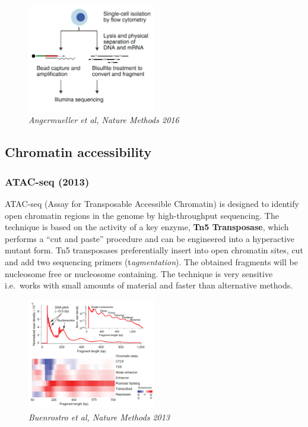 \begin{figure}
\centering
\includegraphics[width=0.5\textwidth]{images/Screenshot_6.png}
\caption{\emph{Angermueller et al, Nature Methods 2016}}
\end{figure}

\hypertarget{chromatin-accessibility}{%
\subsection{Chromatin accessibility}\label{chromatin-accessibility}}

\hypertarget{atac-seq-2013}{%
\subsubsection{ATAC-seq (2013)}\label{atac-seq-2013}}

ATAC-seq (Assay for Transposable Accessible Chromatin) is designed to
identify open chromatin regions in the genome by high-throughput
sequencing. The technique is based on the activity of a key enzyme,
\textbf{Tn5 Transposase}, which performs a ``cut and paste'' procedure
and can be engineered into a hyperactive mutant form. Tn5 transposases
preferentially insert into open chromatin sites, cut and add two
sequencing primers (t\emph{agmentation}). The obtained fragments will be
nucleosome free or nucleosome containing. The technique is very
sensitive i.e.~works with small amounts of material and faster than
alternative methods.

\begin{figure}
\centering
\includegraphics[width=0.5\textwidth]{images/Screenshot_7.png}
\caption{\emph{Buenrostro et al, Nature Methods 2013}}
\end{figure}

